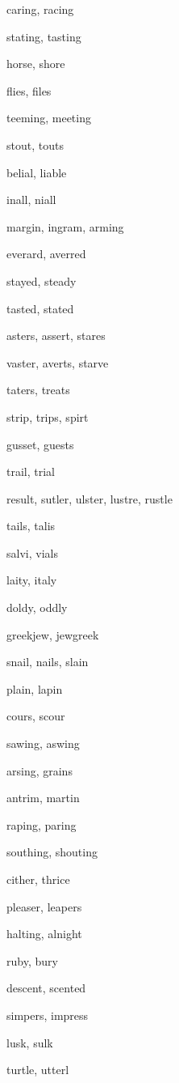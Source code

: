     \item caring, racing
    \item stating, tasting
    \item horse, shore
    \item flies, files
    \item teeming, meeting
    \item stout, touts
    \item belial, liable
    \item inall, niall
    \item margin, ingram, arming
    \item everard, averred
    \item stayed, steady
    \item tasted, stated
    \item asters, assert, stares
    \item vaster, averts, starve
    \item taters, treats
    \item strip, trips, spirt
    \item gusset, guests
    \item trail, trial
    \item result, sutler, ulster, lustre, rustle
    \item tails, talis
    \item salvi, vials
    \item laity, italy
    \item doldy, oddly
    \item greekjew, jewgreek
    \item snail, nails, slain
    \item plain, lapin
    \item cours, scour
    \item sawing, aswing
    \item arsing, grains
    \item antrim, martin
    \item raping, paring
    \item southing, shouting
    \item cither, thrice
    \item pleaser, leapers
    \item halting, alnight
    \item ruby, bury
    \item descent, scented
    \item simpers, impress
    \item lusk, sulk
    \item turtle, utterl
